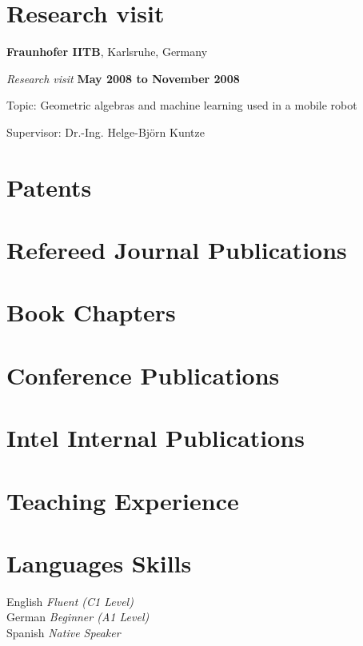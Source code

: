 \section{Research visit}
%
\textbf{Fraunhofer IITB}, Karlsruhe, Germany
\begin{outerlist}
\item[] \textit{Research visit}%
    \hfill \textbf{May 2008 to November 2008}
    \begin{innerlist}
        \item Topic: Geometric algebras and machine learning used in a mobile
              robot
        \item Supervisor: Dr.-Ing. Helge-Bj{\"o}rn Kuntze
    \end{innerlist}
\end{outerlist}

\section{Patents}


\section{Refereed  Journal  Publications}


\section{Book Chapters}


\section{Conference  Publications}


\section{Intel Internal Publications}


\section{Teaching Experience}


\section{Languages Skills}
%
English \textit{Fluent (C1 Level)}\\%
German \textit{Beginner (A1 Level)}\\%
Spanish \textit{Native Speaker}%

